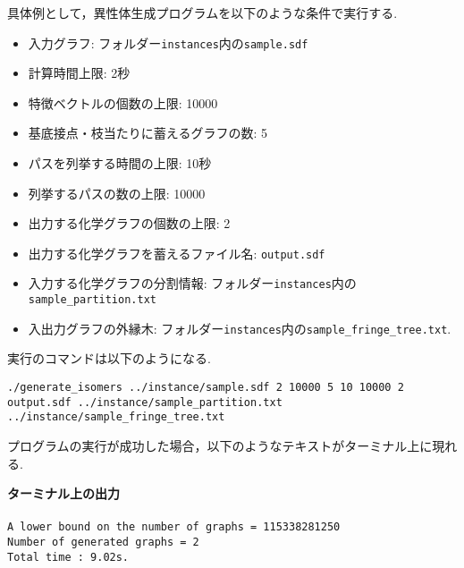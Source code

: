 \documentclass[11pt,titlepage,dvipdfmx,twoside]{jarticle}
\begin{document}
具体例として，異性体生成プログラムを以下のような条件で実行する.

\begin{itemize}
\item 入力グラフ: フォルダー{\tt instances}内の{\tt sample.sdf}
\item 計算時間上限: 2秒
\item 特徴ベクトルの個数の上限: 10000
\item 基底接点・枝当たりに蓄えるグラフの数: 5
\item パスを列挙する時間の上限: 10秒
\item 列挙するパスの数の上限: 10000
\item 出力する化学グラフの個数の上限: 2
\item 出力する化学グラフを蓄えるファイル名: {\tt output.sdf}
\item 入力する化学グラフの分割情報: 
フォルダー{\tt instances}内の{\tt sample\_partition.txt}
\item 入出力グラフの外縁木: 
フォルダー{\tt instances}内の{\tt sample\_fringe\_tree.txt}.
\end{itemize}

実行のコマンドは以下のようになる.

\bigskip


{\tt ./generate\_isomers ../instance/sample.sdf 2 10000 5 10 10000 2} \\
 {\tt output.sdf ../instance/sample\_partition.txt }\\
 {\tt../instance/sample\_fringe\_tree.txt}
%
\bigskip

プログラムの実行が成功した場合，以下のようなテキストがターミナル上に現れる.

\begin{oframed}
{\bf ターミナル上の出力}\\\\
{\tt A lower bound on the number of graphs = 115338281250\\
Number of generated graphs = 2\\
Total time : 9.02s.}
\end{oframed}
\end{document}
